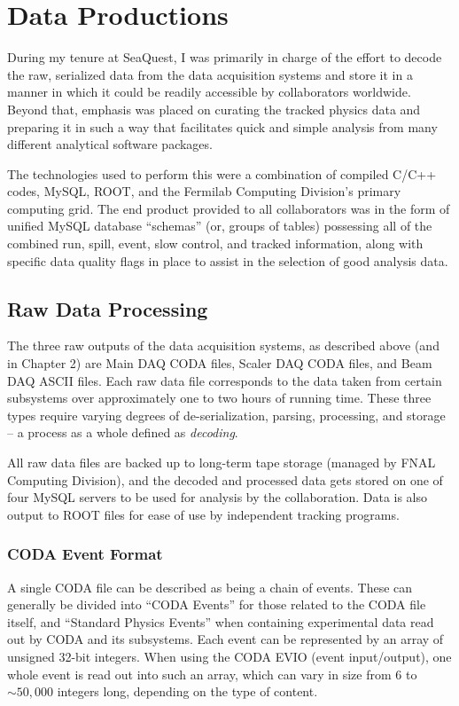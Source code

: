 \chapter{Data Productions}


During my tenure at SeaQuest, I was primarily in charge of the effort to decode the raw, serialized data from the data acquisition systems and store it in a manner in which it could be readily accessible by collaborators worldwide. Beyond that, emphasis was placed on curating the tracked physics data and preparing it in such a way that facilitates quick and simple analysis from many different analytical software packages.

The technologies used to perform this were a combination of compiled C/C++ codes, MySQL, ROOT, and the Fermilab Computing Division's primary computing grid. The end product provided to all collaborators was in the form of unified MySQL database ``schemas'' (or, groups of tables) possessing all of the combined run, spill, event, slow control, and tracked information, along with specific data quality flags in place to assist in the selection of good analysis data.

\section{Raw Data Processing}

The three raw outputs of the data acquisition systems, as described above (and in Chapter 2) are Main DAQ CODA files, Scaler DAQ CODA files, and Beam DAQ ASCII files. Each raw data file corresponds to the data taken from certain subsystems over approximately one to two hours of running time. These three types require varying degrees of de-serialization, parsing, processing, and storage -- a process as a whole defined as \emph{decoding}. 

All raw data files are backed up to long-term tape storage (managed by FNAL Computing Division), and the decoded and processed data gets stored on one of four MySQL servers to be used for analysis by the collaboration. Data is also output to ROOT files for ease of use by independent tracking programs.

\subsection{CODA Event Format}

A single CODA file can be described as being a chain of events. These can generally be divided into ``CODA Events'' for those related to the CODA file itself, and ``Standard Physics Events'' when containing experimental data read out by CODA and its subsystems. Each event can be represented by an array of unsigned 32-bit integers. When using the CODA EVIO (event input/output), one whole event is read out into such an array, which can vary in size from 6 to $\sim50,000$ integers long, depending on the type of content.

